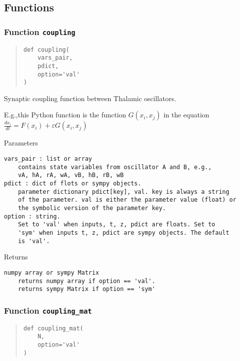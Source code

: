 \documentclass[english,a4paper,oneside]{article}
\begin{document}
\hypertarget{functions-1}{%
\subsection{Functions}\label{functions-1}}

\hypertarget{Thalamic.coupling}{%
\subsubsection{\texorpdfstring{Function
\texttt{coupling}}{Function coupling}}\label{Thalamic.coupling}}

\begin{quote}
\begin{verbatim}
def coupling(
    vars_pair,
    pdict,
    option='val'
)
\end{verbatim}
\end{quote}

Synaptic coupling function between Thalamic oscillators.

E.g.,this Python function is the function \(G(x_i,x_j)\) in the equation
\(\frac{dx_i}{dt} = F(x_i) + \varepsilon G(x_i,x_j)\)

Parameters

\begin{verbatim}
vars_pair : list or array
    contains state variables from oscillator A and B, e.g.,
    vA, hA, rA, wA, vB, hB, rB, wB  
pdict : dict of flots or sympy objects.
    parameter dictionary pdict[key], val. key is always a string
    of the parameter. val is either the parameter value (float) or 
    the symbolic version of the parameter key.
option : string.
    Set to 'val' when inputs, t, z, pdict are floats. Set to
    'sym' when inputs t, z, pdict are sympy objects. The default
    is 'val'.
\end{verbatim}

Returns

\begin{verbatim}
numpy array or sympy Matrix
    returns numpy array if option == 'val'. 
    returns sympy Matrix if option == 'sym'
\end{verbatim}

\hypertarget{Thalamic.coupling_mat}{%
\subsubsection{\texorpdfstring{Function
\texttt{coupling\_mat}}{Function coupling\_mat}}\label{Thalamic.coupling_mat}}

\begin{quote}
\begin{verbatim}
def coupling_mat(
    N,
    option='val'
)
\end{verbatim}
\end{quote}
\end{document}
